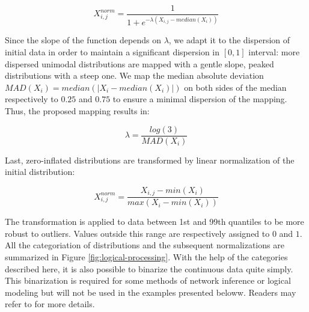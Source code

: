 \documentclass[a4paper,12pt,twoside,onecolumn,openright,final,oldfontcommands]{memoir}
\begin{document}
\[X_{i, j}^{norm}=\dfrac{1}{1+e^{-\lambda(X_{i, j}-median(X_{i}))}}\]

Since the slope of the function depends on \(\lambda\), we adapt it to
the dispersion of initial data in order to maintain a significant
dispersion in \([0, 1]\) interval: more dispersed unimodal distributions
are mapped with a gentle slope, peaked distributions with a steep one.
We map the median absolute deviation
\(MAD(X_{i})=median(|X_{i}-median(X_i)|)\) on both sides of the median
respectively to \(0.25\) and \(0.75\) to ensure a minimal dispersion of
the mapping. Thus, the proposed mapping results in:

\[\lambda=\dfrac{log(3)}{MAD(X_i)}\]

Last, zero-inflated distributions are transformed by linear
normalization of the initial distribution:

\[X_{i, j}^{norm}=\dfrac{X_{i, j}-min(X_{i})}{max(X_{i}-min(X_{i}))}\]

The transformation is applied to data between 1st and 99th quantiles to
be more robust to outliers. Values outside this range are respectively
assigned to \(0\) and \(1\). All the categoriation of distributions and
the subsequent normalizations are summarized in Figure
\ref{fig:logical-processing}. With the help of the categories described
here, it is also possible to binarize the continuous data quite simply.
This binarization is required for some methods of network inference or
logical modeling but will not be used in the examples presented beloww.
Readers may refer to \citet{beal2019personalization} for more details.
\end{document}
